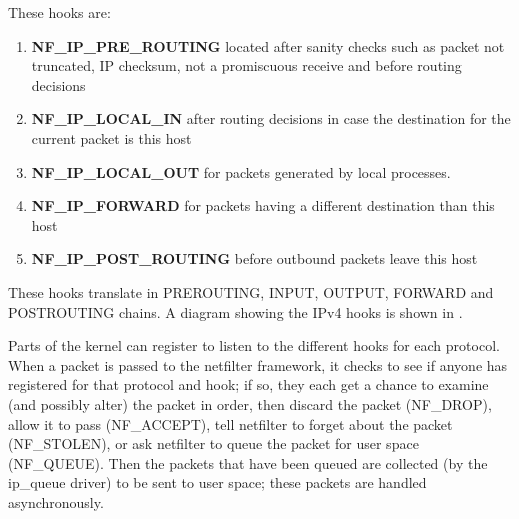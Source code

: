{{These hooks are:
\begin{enumerate}
\item \textbf{NF_IP_PRE_ROUTING} located after sanity checks such as packet not truncated, IP checksum, 
not a promiscuous receive and before routing decisions 
\item \textbf{NF_IP_LOCAL_IN} after routing decisions in case the destination for the current packet 
is this host
\item \textbf{NF_IP_LOCAL_OUT} for packets generated by local processes. 
\item \textbf{NF_IP_FORWARD} for packets having a different destination than this host
\item \textbf{NF_IP_POST_ROUTING} before outbound packets leave this host 
\end{enumerate}
These hooks translate in PREROUTING, INPUT, OUTPUT, FORWARD and POSTROUTING chains.
A diagram showing the IPv4 hooks is shown in .

Parts of the kernel can register to listen to the different hooks for each protocol. When a packet is 
passed to the netfilter framework, it checks to see if anyone has registered for that protocol and hook; 
if so, they each get a chance to examine (and possibly alter) the packet in order, then discard the packet 
(NF_DROP), allow it to pass (NF_ACCEPT), tell netfilter to forget about the packet (NF_STOLEN), or ask 
netfilter to queue the packet for user space (NF_QUEUE). Then the packets that have been queued are collected 
(by the ip_queue driver) to be sent to user space; these packets are handled asynchronously.

}}
